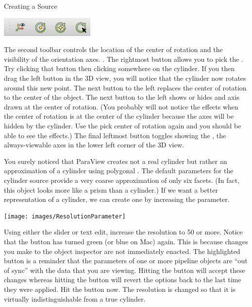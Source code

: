 \begin{exercise}{Creating a Source}
  \begin{inlinefig}
    \includegraphics[width=.415\scw]{images/ToolbarCenterAxis}
  \end{inlinefig}


  The second toolbar controls the location of the center of rotation and
  the visibility of the orientation axes.  .
  The rightmost button  allows you to pick the
  .  Try clicking that button then clicking
  somewhere on the cylinder.  If you then drag the left button in the 3D
  view, you will notice that the cylinder now rotates around this new
  point.   The next button to the left
   replaces the center of rotation to the center of
  the object.   The next button to the left  shows
  or hides and axis drawn at the center of rotation.  (You probably will
  not notice the effects when the center of rotation is at the center of
  the cylinder because the axes will be hidden by the cylinder.  Use the
  pick center of rotation  again and you should be
  able to see the effects.)  The final leftmost button
   toggles showing the
  ,
  the always-viewable axes in the lower left corner of the 3D view.

  You surely noticed that ParaView creates not a real cylinder but
  rather an approximation of a cylinder using polygonal .
  The default parameters for the cylinder source provide a very coarse
  approximation of only six facets. (In fact, this object looks more like a
  prism than a cylinder.) If we want a better representation of a cylinder,
  we can create one by increasing the  parameter.

  \begin{inlinefig}
    \texttt{[image: images/ResolutionParameter]}
  \end{inlinefig}

  Using either the slider or text edit, increase the resolution to 50 or
  more.  Notice that the  button \apply has turned green (or
  blue on Mac) again.  This is because changes you make to the object
  inspector are not immediately enacted.  The highlighted button is a
  reminder that the parameters of one or more pipeline objects are ``out of
  sync'' with the data that you are viewing.  Hitting the 
  button will accept these changes whereas hitting the 
   button \reset will revert the options back to the last time
  they were applied.  Hit the  button now.  The resolution is
  changed so that it is virtually indistinguishable from a true cylinder.
\end{exercise}

